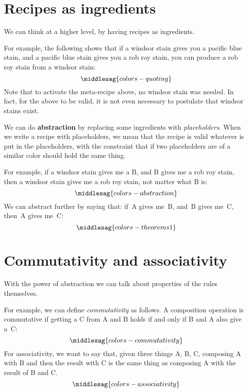 \section{Recipes as ingredients}


We can think at a higher level, by having recipes as ingredients.

For example, the following shows that if a windsor stain gives you a pacific blue stain, and a pacific blue stain gives you a rob roy stain, you can produce a rob roy stain from a windsor stain:
%
\begin{equation}
    \label{eq:colors-quoting}
    \middlesag{colors-quoting}
\end{equation}
%
Note that to activate the meta-recipe above, no windsor stain was needed.
In fact, for the above to be valid, it is not even necessary to postulate that windsor stains exist.

We can do \textbf{abstraction} by replacing some ingredients with \emph{placeholders}.
When we write a recipe with placeholders, we mean that the recipe is valid whatever is put in the placeholders, with the constraint that if two placeholders are of a similar color should hold the same thing.

For example, if a windsor stain gives me a B, and B gives me a rob roy stain, then a windsor stain gives me a rob roy stain, not matter what B is:
%
\begin{equation}
    \label{eq:colors-abstraction}
    \middlesag{colors-abstraction}
\end{equation}
%
We can abstract further by saying that: if~A gives me~B, and~B gives me~C, then~A gives me~C:
%
\begin{equation}
    \label{eq:colors-theorems}
    \middlesag{colors-theorems1}
\end{equation}

\section{Commutativity and associativity}
\label{sec:commutativity-associativity}
With the power of abstraction we can talk about properties of the rules themselves.

For example, we can define \emph{commutativity} as follows.
A composition operation is commutative if getting a C from A and B holds if and only if B and A also give a~C:
\begin{equation}
    \label{eq:colors-commutativity}
    \middlesag{colors-commutativity}
\end{equation}
%
For associativity, we want to say that, given three things A, B, C, composing A with B and then the result with C is the same thing as composing A with the result of B and C.
\begin{equation}
    \label{eq:colors-associativity}
    \middlesag{colors-associativity}
\end{equation}

